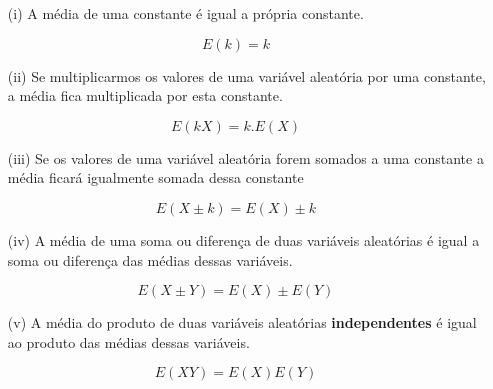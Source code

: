 \begin{enumerate}
    \item[{(i)}] A média de uma constante é igual a própria constante.
\end{enumerate}

\begin{equation}\label{}
E(k)=k
\end{equation}


\begin{enumerate}
    \item[{(ii)}] Se multiplicarmos os valores de uma variável aleatória
    por uma constante, a média fica multiplicada por esta
    constante.
\end{enumerate}


\begin{equation}\label{}
E(kX)=k.E(X)
\end{equation}


\begin{enumerate}
    \item[{(iii)}] Se os valores de uma variável aleatória forem somados a
    uma constante a média ficará igualmente somada dessa constante
\end{enumerate}


\begin{equation}\label{}
E(X\pm k)=E(X)\pm k
\end{equation}


\begin{enumerate}
    \item[{(iv)}] A média de uma soma ou diferença de duas variáveis
    aleatórias é igual a soma ou diferença das médias dessas
    variáveis.
\end{enumerate}


\begin{equation}\label{}
E(X \pm Y)= E(X)\pm E(Y)
\end{equation}


\begin{enumerate}
    \item[{(v)}] A média do produto de duas variáveis
    aleatórias \textbf{independentes} é igual ao produto das
    médias dessas variáveis.
\end{enumerate}


\begin{equation}\label{}
E(XY)= E(X)E(Y)
\end{equation}





